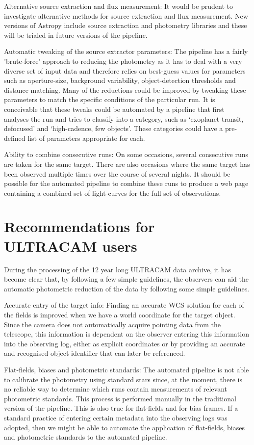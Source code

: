 {Alternative source extraction and flux measurement}: It would be prudent to investigate alternative methods for source extraction and flux measurement. New versions of Astropy include source extraction and photometry libraries and these will be trialed in future versions of the pipeline. 

{Automatic tweaking of the source extractor parameters}: The pipeline has a fairly 'brute-force' approach to reducing the photometry as it has to deal with a very diverse set of input data and therefore relies on best-guess values for parameters such as aperture-size, background variability, object-detection thresholds and distance matching. Many of the reductions could be improved by tweaking these parameters to match the specific conditions of the particular run. It is conceivable that these tweaks could be automated by a pipeline that first analyses the run and tries to classify into a category, such as `exoplanet transit, defocused' and `high-cadence, few objects'. These categories could have a pre-defined list of parameters appropriate for each.
 
{Ability to combine consecutive runs}: On some occasions, several consecutive runs are taken for the same target. There are also occasions where the same target has been observed multiple times over the course of several nights. It should be possible for the automated pipeline to combine these runs to produce a web page containing a combined set of light-curves for the full set of observations. 
 
\section{Recommendations for ULTRACAM users}
During the processing of the 12 year long ULTRACAM data archive, it has become clear that, by following a few simple guidelines, the observers can aid the automatic photometric reduction of the data by following some simple guidelines. 

{Accurate entry of the target info}: Finding an accurate WCS solution for each of the fields is improved when we have a world coordinate for the target object. Since the camera does not automatically acquire pointing data from the telescope, this information is dependent on the observer entering this information into the observing log, either as explicit coordinates or by providing an accurate and recognised object identifier that can later be referenced. 

{Flat-fields, biases and photometric standards}: The automated pipeline is not able to calibrate the photometry using standard stars since, at the moment, there is no reliable way to determine which runs contain measurements of relevant photometric standards. This process is performed manually in the traditional version of the pipeline. This is also true for flat-fields and for bias frames. If a standard practice of entering certain metadata into the observing logs was adopted, then we might be able to automate the application 
of flat-fields, biases and photometric standards to the automated pipeline. 

